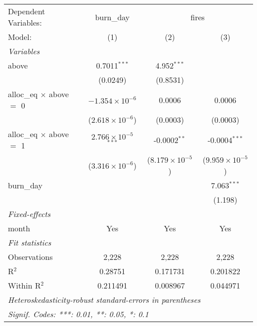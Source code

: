 \begin{tabular}{lccc}
\tabularnewline\midrule\midrule
Dependent Variables:&burn\_day&\multicolumn{2}{c}{fires}\\
Model:&(1) & (2) & (3)\\
\midrule \emph{Variables}&   &   &  \\
above&0.7011$^{***}$ & 4.952$^{***}$ &   \\
  &(0.0249) & (0.8531) &   \\
alloc\_eq $\times $ above $=$ 0&$-1.354\times 10^{-6}$ & 0.0006 & 0.0006\\
  &($2.618\times 10^{-6}$) & (0.0003) & (0.0003)\\
alloc\_eq $\times $ above $=$ 1&$2.766\times 10^{-5}$$^{***}$ & -0.0002$^{**}$ & -0.0004$^{***}$\\
  &($3.316\times 10^{-6}$) & ($8.179\times 10^{-5}$) & ($9.959\times 10^{-5}$)\\
burn\_day&   &    & 7.063$^{***}$\\
  &   &    & (1.198)\\
\midrule \emph{Fixed-effects}&   &   &  \\
month & Yes & Yes & Yes\\
\midrule \emph{Fit statistics}&  & & \\
Observations & 2,228&2,228&2,228\\
R$^2$ & 0.28751&0.171731&0.201822\\
Within R$^2$ & 0.211491&0.008967&0.044971\\
\midrule\midrule\multicolumn{4}{l}{\emph{Heteroskedasticity-robust standard-errors in parentheses}}\\
\multicolumn{4}{l}{\emph{Signif. Codes: ***: 0.01, **: 0.05, *: 0.1}}\\
\end{tabular}


